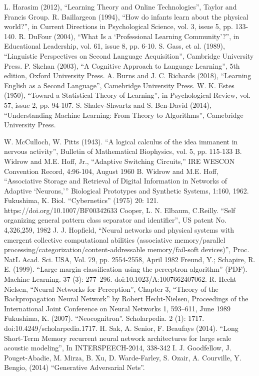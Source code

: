 \documentclass[conference]{IEEEtran}
\begin{document}
\begin{thebibliography}{00}
 L. Harasim (2012), ``Learning Theory and Online Technologies'', Taylor and Francis Group.
 R. Baillargeon (1994), ``How do infants learn about the physical world?'', in Current Directions in Psychological Science, vol. 3, issue 5, pp. 133-140.
 R. DuFour (2004), ``What Is a ‘Professional Learning Community’?'', in Educational Leadership, vol. 61, issue 8, pp. 6-10.
 S. Gass, et al. (1989), ``Linguistic Perspectives on Second Language Acquisition'', Cambridge University Press.
 P. Skehan (2003), ``A Cognitive Approach to Language Learning'', 5th edition, Oxford University Press.
 A. Burns and J. C. Richards (2018), ``Learning English as a Second Language'', Camebridge University Press.
 W. K. Estes (1950), ``Toward a Statistical Theory of Learning'', in Psychological Review, vol. 57, issue 2, pp. 94-107.
 S. Shalev-Shwartz and S. Ben-David (2014), ``Understanding Machine Learning: From Theory to Algorithms'', Camebridge University Press.



 W. McCulloch, W. Pitts (1943). ``A logical calculus of the idea immanent in nervous activity'', Bulletin of Mathematical Biophysics, vol. 5, pp. 115-133
 B. Widrow and M.E. Hoff, Jr., ``Adaptive Switching Circuits,'' IRE WESCON Convention Record, 4:96-104, August 1960
 B. Widrow and M.E. Hoff, ``Associative Storage and Retrieval of Digital Information in Networks of Adaptive `Neurons,''' Biological Prototypes and Synthetic Systems, 1:160, 1962.
 Fukushima, K. Biol. ``Cybernetics'' (1975) 20: 121. https://doi.org/10.1007/BF00342633
 Cooper, L. N. Elbaum, C.Reilly. ``Self organizing general pattern class separator and identifier'', US patent No. 4,326,259, 1982
 J. J. Hopfield, ``Neural networks and physical systems with emergent collective computational abilities (associative memory/parallel processing/categorization/content-addressable memory/fail-soft devices)'', Proc. NatL Acad. Sci. USA, Vol. 79, pp. 2554-2558, April 1982
Freund, Y.; Schapire, R. E. (1999). ``Large margin classification using the perceptron algorithm'' (PDF). Machine Learning. 37 (3): 277–296. doi:10.1023/A:1007662407062.
 R. Hecht-Nielsen, ``Neural Networks for Perception'', Chapter 3, ``Theory of the Backpropagation Neural Network'' by Robert Hecht-Nielsen, Proceedings of the International Joint Conference on Neural Networks 1, 593–611, June 1989
 Fukushima, K. (2007). ``Neocognitron''. Scholarpedia. 2 (1): 1717. doi:10.4249/scholarpedia.1717.
 H. Sak, A. Senior, F. Beaufays (2014). ``Long Short-Term Memory recurrent neural network architectures for large scale acoustic modeling'', In INTERSPEECH-2014, 338-342
 I. J. Goodfellow, J. Pouget-Abadie, M. Mirza, B. Xu, D. Warde-Farley, S. Ozair, A. Courville, Y. Bengio, (2014) ``Generative Adversarial Nets''.


\end{thebibliography}
\vspace{12pt}
\end{document}
